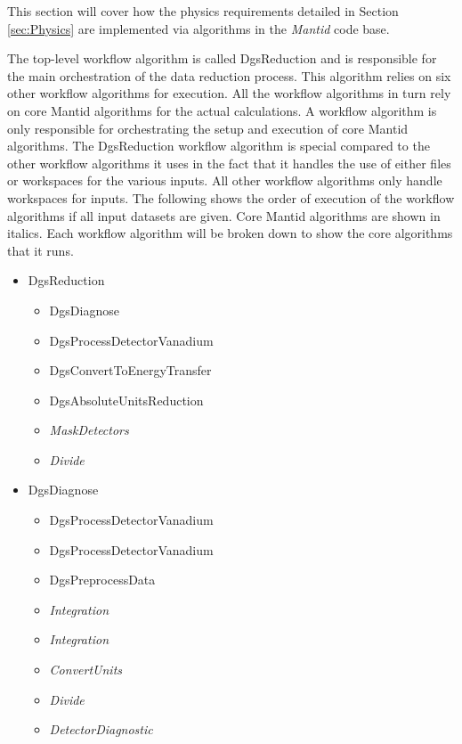 This section will cover how the physics requirements detailed in Section \ref{sec:Physics} are implemented via algorithms in the \textit{Mantid} code base.

The top-level workflow algorithm is called DgsReduction and is responsible for the main orchestration of the data reduction process. This algorithm relies on six other workflow algorithms for execution. All the workflow algorithms in turn rely on core Mantid algorithms for the actual calculations. A workflow algorithm is only responsible for orchestrating the setup and execution of core Mantid algorithms. The DgsReduction workflow algorithm is special compared to the other workflow algorithms it uses in the fact that it handles the use of either files or workspaces for the various inputs. All other workflow algorithms only handle workspaces for inputs. The following shows the order of execution of the workflow algorithms if all input datasets are given. Core Mantid algorithms are shown in italics. Each workflow algorithm will be broken down to show the core algorithms that it runs. 
\begin{itemize}
\item DgsReduction
\begin{itemize}
\item DgsDiagnose
\item DgsProcessDetectorVanadium
\item DgsConvertToEnergyTransfer
\item DgsAbsoluteUnitsReduction
\item \textit{MaskDetectors}
\item \textit{Divide}
\end{itemize}
\end{itemize}

\begin{itemize}
\item DgsDiagnose
\begin{itemize}
\item DgsProcessDetectorVanadium
\item DgsProcessDetectorVanadium
\item DgsPreprocessData
\item \textit{Integration}
\item \textit{Integration}
\item \textit{ConvertUnits}
\item \textit{Divide}
\item \textit{DetectorDiagnostic}
\end{itemize}
\end{itemize}

